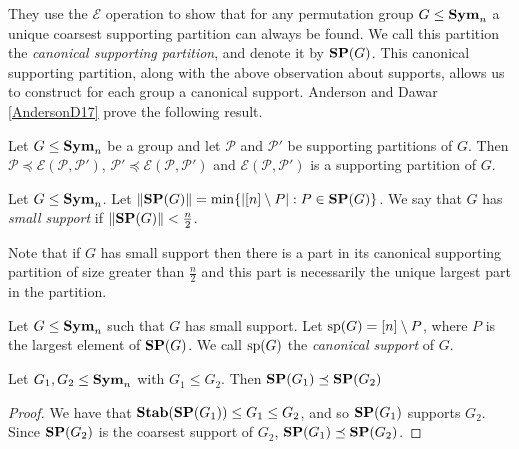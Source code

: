 \documentclass[../paper.tex]{subfiles}
\begin{document}
They use the $\mathcal{E}$ operation to show that for any permutation group $G
\leq \text{\textbf{Sym}}_n$ a unique coarsest supporting partition can always be found. We call
this partition the \emph{canonical supporting partition}, and denote it by $\text{\textbf{SP}}
(G)$. This canonical supporting partition, along with the above observation
about supports, allows us to construct for each group a canonical support.
Anderson and Dawar \ref{AndersonD17} prove the following result.

\begin{prop}
  Let $G \leq \text{\textbf{Sym}}_n$ be a group and let $\mathcal{P}$ and $\mathcal{P}'$ be
  supporting partitions of $G$. Then $\mathcal{P} \preceq
  \mathcal{E}(\mathcal{P}, \mathcal{P}')$, $ \mathcal{P}' \preceq
  \mathcal{E}(\mathcal{P}, \mathcal{P}')$ and $\mathcal{E}(\mathcal{P},
  \mathcal{P}')$ is a supporting partition of $G$.
  \label{prop:combining-supporting-patitions}
\end{prop}

\begin{definition}
  Let $G \leq \text{\textbf{Sym}}_n$. Let $\| \text{\textbf{SP}}(G) \| = \min \{\vert [n] \setminus P \vert :
  P \in \text{\textbf{SP}}(G) \}$. We say that $G$ has \emph{small support} if $\| \text{\textbf{SP}}(G) \| <
  \frac{n}{2}$.
\end{definition}

Note that if $G$ has small support then there is a part in its canonical
supporting partition of size greater than $\frac{n}{2}$ and this part is
necessarily the unique largest part in the partition.

\begin{definition}
  Let $G \leq \text{\textbf{Sym}}_n$ such that $G$ has small support. Let $\text{sp}(G) = [n]
  \setminus P$, where $P$ is the largest element of $\text{\textbf{SP}}(G)$. We call
  $\text{sp}(G)$ the \emph{canonical support} of $G$.
\end{definition}


\begin{lem}\label{lem:subgroup-coarse}
  Let $G_1, G_2 \leq \text{\textbf{Sym}}_n$ with $G_1 \leq G_2$. Then $\text{\textbf{SP}}(G_1) \preceq
  \text{\textbf{SP}}(G_2)$
\end{lem}
\begin{proof}
  We have that $\text{\textbf{Stab}}(\text{\textbf{SP}}(G_1)) \leq G_1 \leq G_2$, and so $\text{\textbf{SP}}(G_1)$ supports
  $G_2$. Since $\text{\textbf{SP}}(G_2)$ is the coarsest support of $G_2$, $\text{\textbf{SP}}(G_1) \preceq
  \text{\textbf{SP}}(G_2)$.
\end{proof}
\end{document}
